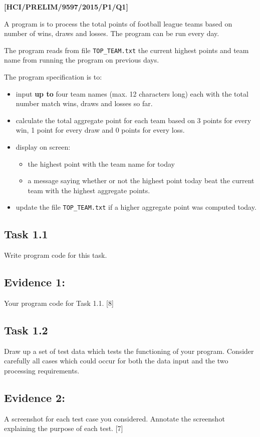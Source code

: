 \item \textbf{{[}HCI/PRELIM/9597/2015/P1/Q1{]} }

A program is to process the total points of football league teams
based on number of wins, draws and losses. The program can be run
every day. 

The program reads from file \texttt{TOP\_TEAM.txt} the current highest
points and team name from running the program on previous days. 

The program specification is to: 
\begin{itemize}
\item input \textbf{up to} four team names (max. 12 characters long) each
with the total number match wins, draws and losses so far.
\item calculate the total aggregate point for each team based on 3 points
for every win, 1 point for every draw and 0 points for every loss. 
\item display on screen: 
\begin{itemize}
\item the highest point with the team name for today 
\item a message saying whether or not the highest point today beat the current
team with the highest aggregate points. 
\end{itemize}
\item update the file \texttt{TOP\_TEAM.txt} if a higher aggregate point
was computed today. 
\end{itemize}

\subsection*{Task 1.1 }

Write program code for this task. 

\subsection*{Evidence 1: }

Your program code for Task 1.1. \hfill{}{[}8{]}

\subsection*{Task 1.2 }

Draw up a set of test data which tests the functioning of your program.
Consider carefully all cases which could occur for both the data input
and the two processing requirements. 

\subsection*{Evidence 2: }

A screenshot for each test case you considered. Annotate the screenshot
explaining the purpose of each test. \hfill{}{[}7{]}